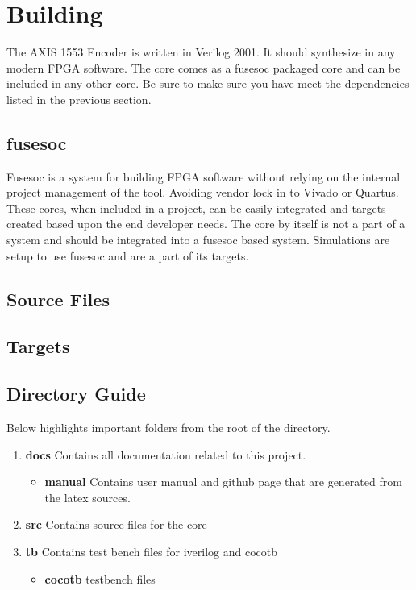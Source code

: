 \section{Building}

\par
The AXIS 1553 Encoder is written in Verilog 2001. It should synthesize in any modern FPGA software. The core comes as a fusesoc packaged core and can be
included in any other core. Be sure to make sure you have meet the dependencies listed in the previous section.

\subsection{fusesoc}
\par
Fusesoc is a system for building FPGA software without relying on the internal project management of the tool. Avoiding vendor lock in to Vivado or Quartus.
These cores, when included in a project, can be easily integrated and targets created based upon the end developer needs. The core by itself is not a part of
a system and should be integrated into a fusesoc based system. Simulations are setup to use fusesoc and are a part of its targets.

\subsection{Source Files}



\subsection{Targets}



\subsection{Directory Guide}

\par
Below highlights important folders from the root of the directory.

\begin{enumerate}
  \item \textbf{docs} Contains all documentation related to this project.
    \begin{itemize}
      \item \textbf{manual} Contains user manual and github page that are generated from the latex sources.
    \end{itemize}
  \item \textbf{src} Contains source files for the core
  \item \textbf{tb} Contains test bench files for iverilog and cocotb
    \begin{itemize}
      \item \textbf{cocotb} testbench files
    \end{itemize}
\end{enumerate}

